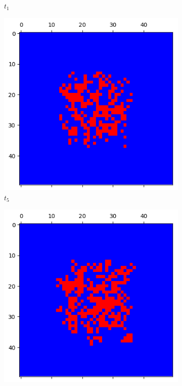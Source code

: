 \documentclass[letterpaper]{article}
\begin{document}
\begin{figure}[H]
\begin{subfigure}{.33\textwidth}
      \caption{$t_{1}$}
    \end{subfigure}
    \begin{subfigure}{.33\textwidth}
      \centering
      \includegraphics[width=1\linewidth]{images/assign2/part32-coop/t5}
      \caption{$t_{5}$}
    \end{subfigure}
    \begin{subfigure}{.33\textwidth}
      \centering
      \includegraphics[width=1\linewidth]{images/assign2/part32-coop/t10}

\end{subfigure}
\end{figure}
\end{document}
